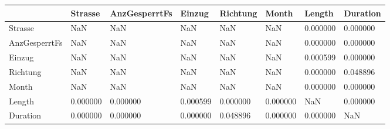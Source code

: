\begin{tabular}{llllllll}
\toprule
{} &  Strasse & AnzGesperrtFs &   Einzug & Richtung &    Month &   Length & Duration \\
\midrule
Strasse       &      NaN &           NaN &      NaN &      NaN &      NaN & 0.000000 & 0.000000 \\
AnzGesperrtFs &      NaN &           NaN &      NaN &      NaN &      NaN & 0.000000 & 0.000000 \\
Einzug        &      NaN &           NaN &      NaN &      NaN &      NaN & 0.000599 & 0.000000 \\
Richtung      &      NaN &           NaN &      NaN &      NaN &      NaN & 0.000000 & 0.048896 \\
Month         &      NaN &           NaN &      NaN &      NaN &      NaN & 0.000000 & 0.000000 \\
Length        & 0.000000 &      0.000000 & 0.000599 & 0.000000 & 0.000000 &      NaN & 0.000000 \\
Duration      & 0.000000 &      0.000000 & 0.000000 & 0.048896 & 0.000000 & 0.000000 &      NaN \\
\bottomrule
\end{tabular}
